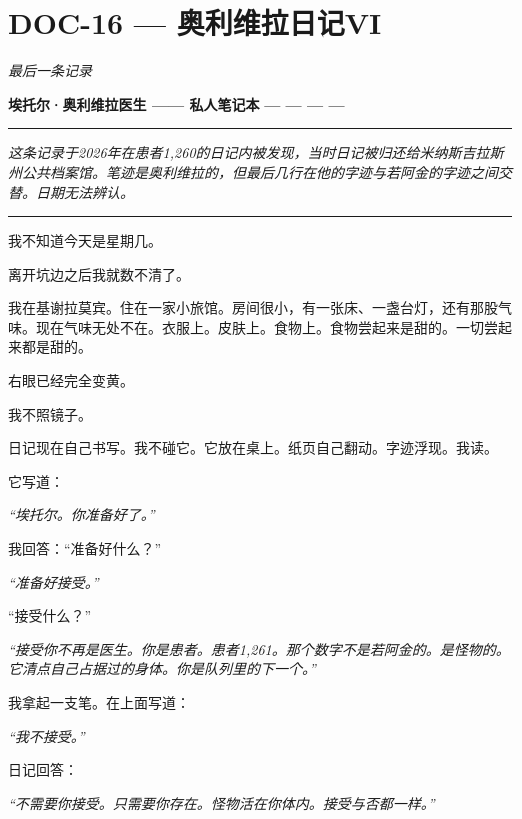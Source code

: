 \section*{\textbf{DOC-16} --- 奥利维拉日记VI}

\noindent \textit{最后一条记录}

\noindent \textbf{埃托尔·奥利维拉医生 —— 私人笔记本}
\textbf{--- --- --- ---}

\vspace{0.5em}\noindent\rule{\textwidth}{0.5pt}\vspace{0.5em}

\noindent \textit{这条记录于2026年在患者1,260的日记内被发现，当时日记被归还给米纳斯吉拉斯州公共档案馆。笔迹是奥利维拉的，但最后几行在他的字迹与若阿金的字迹之间交替。日期无法辨认。}

\vspace{0.5em}\noindent\rule{\textwidth}{0.5pt}\vspace{0.5em}

\noindent 我不知道今天是星期几。

\noindent 离开坑边之后我就数不清了。

\noindent 我在基谢拉莫宾。住在一家小旅馆。房间很小，有一张床、一盏台灯，还有那股气味。现在气味无处不在。衣服上。皮肤上。食物上。食物尝起来是甜的。一切尝起来都是甜的。

\noindent 右眼已经完全变黄。

\noindent 我不照镜子。

\noindent 日记现在自己书写。我不碰它。它放在桌上。纸页自己翻动。字迹浮现。我读。

\noindent 它写道：

\noindent \textit{“埃托尔。你准备好了。”}

\noindent 我回答：“准备好什么？”

\noindent \textit{“准备好接受。”}

\noindent “接受什么？”

\noindent \textit{“接受你不再是医生。你是患者。患者1,261。那个数字不是若阿金的。是怪物的。它清点自己占据过的身体。你是队列里的下一个。”}

\noindent 我拿起一支笔。在上面写道：

\noindent \textit{“我不接受。”}

\noindent 日记回答：

\noindent \textit{“不需要你接受。只需要你存在。怪物活在你体内。接受与否都一样。”}

